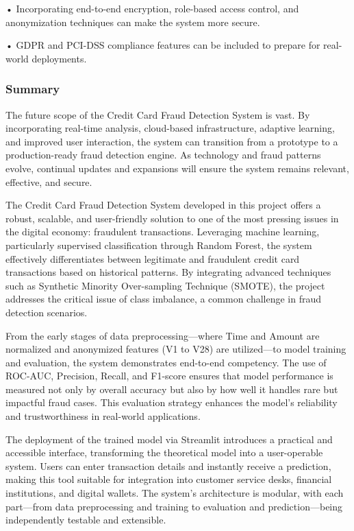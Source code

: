 \documentclass[11pt,a4paper]{article}
\begin{document}
• 
Incorporating end-to-end encryption, role-based access control, and anonymization 
techniques can make the system more secure. 

• 
GDPR and PCI-DSS compliance features can be included to prepare for real-world 
deployments. 

\subsubsection*{Summary }

The future scope of the Credit Card Fraud Detection System is vast. By incorporating real-time 
analysis, cloud-based infrastructure, adaptive learning, and improved user interaction, the system 
can transition from a prototype to a production-ready fraud detection engine. As technology and 
fraud patterns evolve, continual updates and expansions will ensure the system remains relevant, 
effective, and secure. 

The Credit Card Fraud Detection System developed in this project offers a robust, scalable, and 
user-friendly solution to one of the most pressing issues in the digital economy: fraudulent 
transactions. Leveraging machine learning, particularly supervised classification through Random 
Forest, the system effectively differentiates between legitimate and fraudulent credit card 
transactions based on historical patterns. By integrating advanced techniques such as Synthetic 
Minority Over-sampling Technique (SMOTE), the project addresses the critical issue of class 
imbalance, a common challenge in fraud detection scenarios. 

From the early stages of data preprocessing—where Time and Amount are normalized and 
anonymized features (V1 to V28) are utilized—to model training and evaluation, the system 
demonstrates end-to-end competency. The use of ROC-AUC, Precision, Recall, and F1-score 
ensures that model performance is measured not only by overall accuracy but also by how well it 
handles rare but impactful fraud cases. This evaluation strategy enhances the model's reliability and 
trustworthiness in real-world applications. 

The deployment of the trained model via Streamlit introduces a practical and accessible interface, 
transforming the theoretical model into a user-operable system. Users can enter transaction details 
and instantly receive a prediction, making this tool suitable for integration into customer service 
desks, financial institutions, and digital wallets. The system's architecture is modular, with each 
part—from data preprocessing and training to evaluation and prediction—being independently 
testable and extensible. 
\end{document}
